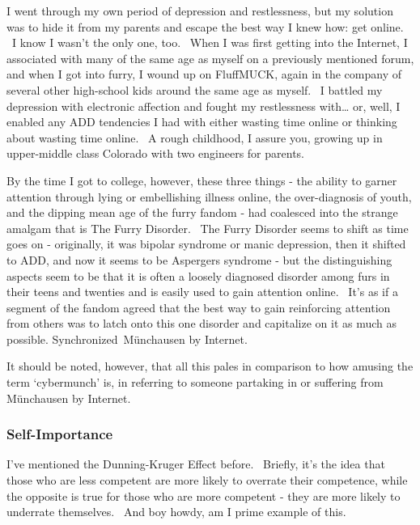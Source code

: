I went through my own period of depression and restlessness, but my
solution was to hide it from my parents and escape the best way I knew
how: get online. ~I know I wasn't the only one, too. ~When I was first
getting into the Internet, I associated with many of the same age as
myself on a previously mentioned forum, and when I got into furry, I
wound up on FluffMUCK, again in the company of several other high-school
kids around the same age as myself. ~I battled my depression with
electronic affection and fought my restlessness with\ldots{} or, well, I
enabled any ADD tendencies I had with either wasting time online or
thinking about wasting time online. ~A rough childhood, I assure you,
growing up in upper-middle class Colorado with two engineers for
parents.

By the time I got to college, however, these three things - the ability
to garner attention through lying or embellishing illness online, the
over-diagnosis of youth, and the dipping mean age of the furry fandom -
had coalesced into the strange amalgam that is The Furry Disorder. ~The
Furry Disorder seems to shift as time goes on - originally, it was
bipolar syndrome or manic depression, then it shifted to ADD, and now it
seems to be Aspergers syndrome - but the distinguishing aspects seem to
be that it is often a loosely diagnosed disorder among furs in their
teens and twenties and is easily used to gain attention online. ~It's as
if a segment of the fandom agreed that the best way to gain reinforcing
attention from others was to latch onto this one disorder and capitalize
on it as much as possible. Synchronized~Münchausen by Internet.

It should be noted, however, that all this pales in comparison to how
amusing the term `cybermunch' is, in referring to someone partaking in
or suffering from Münchausen by Internet.

\subsubsection{Self-Importance}\label{self-importance}

I've mentioned the Dunning-Kruger Effect before. ~Briefly, it's the idea
that those who are less competent are more likely to overrate their
competence, while the opposite is true for those who are more competent
- they are more likely to underrate themselves. ~And boy howdy, am I
prime example of this.

